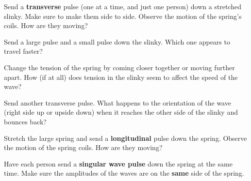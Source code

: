 \documentclass[10pt]{exam}
\begin{document}
\begin{questions}

  
  \question
    Send a {\bf transverse} pulse (one at a time, and just one person) down a stretched slinky.  Make sure to make them side to side. Observe the motion of the spring's coils. How are they moving?
    \vs 
  
  \question
    Send a large pulse and a small pulse down the slinky. Which one appears to travel faster? 
    \vs
  
  
  
  \question
    Change the tension of the spring by coming closer together or moving further apart.  How (if at all) does tension in the slinky seem to affect the speed of the wave?
    \vs
  
  \question
    Send another transverse pulse.  What happens to the orientation of the wave (right side up or upside down) when it reaches the other side of the slinky and bounces back?
    \vs
  
  \question
    Stretch the large spring and send a {\bf longitudinal} pulse down the spring.  Observe the motion of the spring coils.  How are they moving?
    \vs
  
  
  
  
  \question
    Have each person send a {\bf singular wave pulse} down the spring at the same time.  Make sure the amplitudes of the waves are on the {\bf same} side of the spring.  
  
\end{questions}
\end{document}

